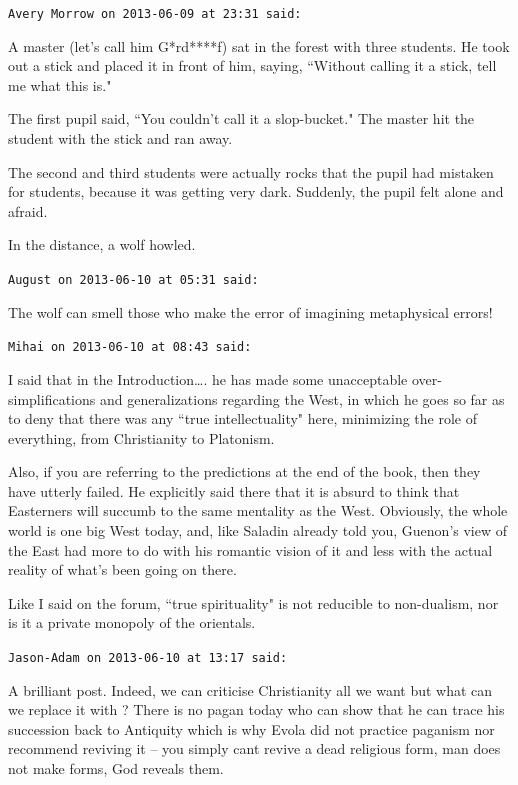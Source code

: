 \begin{footnotesize}\begin{sffamily}



\texttt{Avery Morrow on 2013-06-09 at 23:31 said: }

A master (let's call him G*rd****f) sat in the forest with three students. He took out a stick and placed it in front of him, saying, ``Without calling it a stick, tell me what this is."

The first pupil said, ``You couldn't call it a slop-bucket." The master hit the student with the stick and ran away.

The second and third students were actually rocks that the pupil had mistaken for students, because it was getting very dark. Suddenly, the pupil felt alone and afraid.

In the distance, a wolf howled.


\hfill

\texttt{August on 2013-06-10 at 05:31 said: }

The wolf can smell those who make the error of imagining metaphysical errors!


\hfill

\texttt{Mihai on 2013-06-10 at 08:43 said: }

I said that in the Introduction…. he has made some unacceptable over-simplifications and generalizations regarding the West, in which he goes so far as to deny that there was any ``true intellectuality" here, minimizing the role of everything, from Christianity to Platonism.

Also, if you are referring to the predictions at the end of the book, then they have utterly failed. He explicitly said there that it is absurd to think that Easterners will succumb to the same mentality as the West. Obviously, the whole world is one big West today, and, like Saladin already told you, Guenon's view of the East had more to do with his romantic vision of it and less with the actual reality of what's been going on there. 

Like I said on the forum, ``true spirituality" is not reducible to non-dualism, nor is it a private monopoly of the orientals.


\hfill

\texttt{Jason-Adam on 2013-06-10 at 13:17 said: }

A brilliant post. Indeed, we can criticise Christianity all we want but what can we replace it with ? There is no pagan today who can show that he can trace his succession back to Antiquity which is why Evola did not practice paganism nor recommend reviving it – you simply cant revive a dead religious form, man does not make forms, God reveals them. 


\end{sffamily}
\end{footnotesize}
